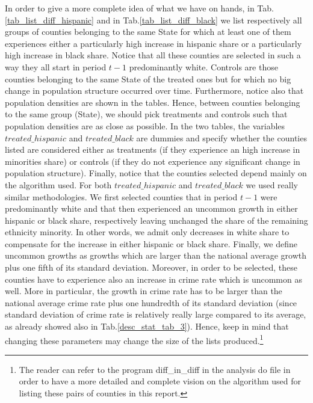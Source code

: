 \documentclass[a4paper,12pt]{article}
\begin{document}
\noindent
In order to give a more complete idea of what we have on hands, in Tab.\ref{tab_list_diff_hispanic} and in Tab.\ref{tab_list_diff_black} we list respectively all groups of counties belonging to the same State for which at least one of them experiences either a particularly high increase in hispanic share or a particularly high increase in black share. Notice that all these counties are selected in such a way they all start in period $t-1$ predominantly white. Controls are those counties belonging to the same State of the treated ones but for which no big change in population structure occurred over time. Furthermore, notice also that population densities are shown in the tables. Hence, between counties belonging to the same group (State), we should pick treatments and controls such that population densities are as close as possible. In the two tables, the variables $treated\_hispanic$ and $treated\_black$ are dummies and specify whether the counties listed are considered either as treatments (if they experience an high increase in minorities share) or controls (if they do not experience any significant change in population structure). Finally, notice that the counties selected depend mainly on the algorithm used. For both $treated\_hispanic$ and $treated\_black$ we used really similar methodologies. We first selected counties that in period $t-1$ were predominantly white and that then experienced an uncommon growth in either hispanic or black share, respectively leaving unchanged the share of the remaining ethnicity minority. In other words, we admit only decreases in white share to compensate for the increase in either hispanic or black share. Finally, we define uncommon growths as growths which are larger than the national average growth plus one fifth of its standard deviation. Moreover, in order to be selected, these counties have to experience also an increase in crime rate which is uncommon as well. More in particular, the growth in crime rate has to be larger than the national average crime rate plus one hundredth of its standard deviation (since standard deviation of crime rate is relatively really large compared to its average, as already showed also in Tab.\ref{desc_stat_tab_3}). Hence, keep in mind that changing these parameters may change the size of the lists produced.\footnote{The reader can refer to the program diff\_in\_diff in the analysis do file in order to have a more detailed and complete vision on the algorithm used for listing these pairs of counties in this report.} 
\end{document}
